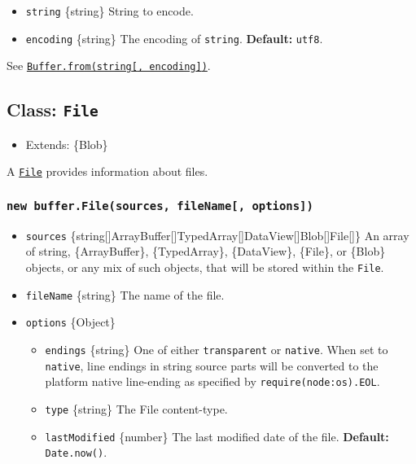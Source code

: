 \begin{itemize}
\tightlist
\item
  \texttt{string} \{string\} String to encode.
\item
  \texttt{encoding} \{string\} The encoding of \texttt{string}.
  \textbf{Default:} \texttt{\textquotesingle{}utf8\textquotesingle{}}.
\end{itemize}

See
\hyperref[static-method-bufferfromstring-encoding]{\texttt{Buffer.from(string{[},\ encoding{]})}}.

\subsection{\texorpdfstring{Class:
\texttt{File}}{Class: File}}\label{class-file}

\begin{itemize}
\tightlist
\item
  Extends: \{Blob\}
\end{itemize}

A
\href{https://developer.mozilla.org/en-US/docs/Web/API/File}{\texttt{File}}
provides information about files.

\subsubsection{\texorpdfstring{\texttt{new\ buffer.File(sources,\ fileName{[},\ options{]})}}{new buffer.File(sources, fileName{[}, options{]})}}\label{new-buffer.filesources-filename-options}

\begin{itemize}
\tightlist
\item
  \texttt{sources}
  \{string{[}{]}\textbar ArrayBuffer{[}{]}\textbar TypedArray{[}{]}\textbar DataView{[}{]}\textbar Blob{[}{]}\textbar File{[}{]}\}
  An array of string, \{ArrayBuffer\}, \{TypedArray\}, \{DataView\},
  \{File\}, or \{Blob\} objects, or any mix of such objects, that will
  be stored within the \texttt{File}.
\item
  \texttt{fileName} \{string\} The name of the file.
\item
  \texttt{options} \{Object\}

  \begin{itemize}
  \tightlist
  \item
    \texttt{endings} \{string\} One of either
    \texttt{\textquotesingle{}transparent\textquotesingle{}} or
    \texttt{\textquotesingle{}native\textquotesingle{}}. When set to
    \texttt{\textquotesingle{}native\textquotesingle{}}, line endings in
    string source parts will be converted to the platform native
    line-ending as specified by
    \texttt{require(\textquotesingle{}node:os\textquotesingle{}).EOL}.
  \item
    \texttt{type} \{string\} The File content-type.
  \item
    \texttt{lastModified} \{number\} The last modified date of the file.
    \textbf{Default:} \texttt{Date.now()}.
  \end{itemize}
\end{itemize}


